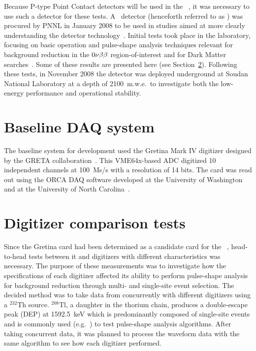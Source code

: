 	Because P-type Point Contact detectors will be used in the \MJ~\minmod, it was necessary to use such a detector for these tests.  A \ppc~detector (henceforth referred to as ) was procured by PNNL in January 2008 to be used in studies aimed at more clearly understanding the detector technology~\cite{Orr2007}.  Initial tests took place in the laboratory, focusing on basic operation and pulse-shape analysis techniques relevant for background reduction in the $0 \nu \beta \beta$ region-of-interest and for Dark Matter searches~\cite{Orr2008}.  Some of these results are presented here (see Section~\ref{sec:HeadToHeadCompare}).  Following these tests, in November 2008 the detector was deployed underground at Soudan National Laboratory at a depth of 2100~m.w.e.~to investigate both the low-energy performance and operational stability.
	   
	\section{Baseline DAQ system}

	The baseline system for development used the Gretina Mark IV digitizer designed by the GRETA collaboration~\cite{Anderson:2009p1293}.  This VME64x-based ADC digitized 10 independent channels at 100~Ms/s with a resolution of 14 bits.  The card was read out using the ORCA DAQ software developed at the University of Washington and at the University of North Carolina~\cite{ORCA}.%
	
	\section{Digitizer comparison tests}
     	\label{sec:HeadToHeadCompare}
	
	Since the Gretina card had been determined as a candidate card for the \MJ~\minmod, head-to-head tests between it and digitizers with different characteristics was necessary.  The purpose of these measurements was to investigate how the specifications of each digitizer affected its ability to perform pulse-shape analysis for background reduction through multi- and single-site event selection.  The decided method was to take data from  concurrently with different digitizers using a $^{232}$Th source.  $^{208}$Tl, a daughter in the thorium chain, produces a double-escape peak (DEP) at 1592.5~keV which is predominantly composed of single-site events and is commonly used (e.g.~\cite{Abt2007332,Orrell:2007tt}) to test pulse-shape analysis algorithms.  After taking concurrent data, it was planned to process the waveform data with the same algorithm to see how each digitizer performed.
	
